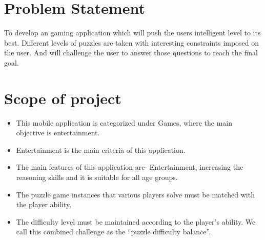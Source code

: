 \section{Problem Statement}
\hspace{1cm}To develop an gaming application which will push the users intelligent level to its best. Different levels of puzzles are taken with interesting constraints imposed on the user. And will challenge the user to answer those questions to reach the final goal.\\

\section{Scope of project}	
\begin{itemize}
\item \textbf {}This mobile application is categorized under Games, where the main objective is entertainment. 
\item \textbf {}Entertainment is the main criteria of this application.
\item \textbf {}The main features of this application are- Entertainment, increasing the reasoning skills and it is suitable for all age groups.
\item \textbf {}The puzzle game instances that various players solve must be matched with the player ability.
\item \textbf {}The difficulty level must be maintained according to the player’s ability. We call this combined challenge as the “puzzle difficulty balance”.
\end{itemize}


